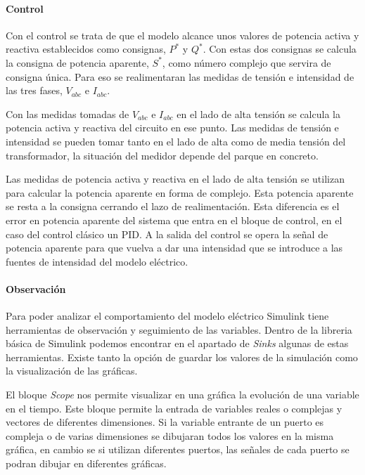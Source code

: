 \documentclass{book}
\begin{document}
		\paragraph{Control} 
Con el control se trata de que el modelo alcance unos valores de potencia activa y reactiva establecidos como consignas, $P^*$ y $Q^*$. Con estas dos consignas se calcula la consigna de potencia aparente, $S^*$, como n\'umero complejo que servira de consigna \'unica. Para eso se realimentaran las medidas de tensi\'on e intensidad de las tres fases, $V_{abc}$ e $I_{abc}$. \par

Con las medidas tomadas de $V_{abc}$ e $I_{abc}$ en el lado de alta tensi\'on se calcula la potencia activa y reactiva del circuito en ese punto. Las medidas de tensi\'on e intensidad se pueden tomar tanto en el lado de alta como de media tensi\'on del transformador, la situaci\'on del medidor depende del parque en concreto. \par

Las medidas de potencia activa y reactiva en el lado de alta tensi\'on se utilizan para calcular la potencia aparente en forma de complejo. Esta potencia aparente se resta a la consigna cerrando el lazo de realimentaci\'on. Esta diferencia es el error en potencia aparente del sistema que entra en el bloque de control, en el caso del control cl\'asico un PID. A la salida del control se opera la señal de potencia aparente para que vuelva a dar una intensidad que se introduce a las fuentes de intensidad del modelo el\'ectrico.  \par

		\paragraph{Observaci\'on}
Para poder analizar el comportamiento del modelo el\'ectrico Simulink tiene herramientas de observación y seguimiento de las variables. Dentro de la libreria b\'asica de Simulink podemos encontrar en el apartado de \emph{Sinks} algunas de estas herramientas. Existe tanto la opci\'on de guardar los valores de la simulaci\'on como la visualizaci\'on de las gr\'aficas. \par

El bloque \emph{Scope} nos permite visualizar en una gr\'afica la evoluci\'on de una variable en el tiempo. Este bloque permite la entrada de variables reales o complejas y vectores de diferentes dimensiones. Si la variable entrante de un puerto es compleja o de varias dimensiones se dibujaran todos los valores en la misma gr\'afica, en cambio se si utilizan diferentes puertos, las señales de cada puerto se podran dibujar en diferentes gr\'aficas.  \par
\end{document}
